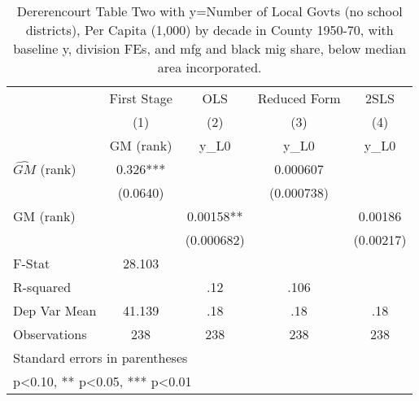 \begin{table}[htbp]\centering
\def\sym#1{\ifmmode^{#1}\else\(^{#1}\)\fi}
\caption{Dererencourt Table Two with y=Number of Local Govts (no school districts), Per Capita (1,000) by decade in County 1950-70, with baseline y, division FEs, and mfg and black mig share, below median area incorporated.}
\begin{tabular}{l*{4}{c}}
\toprule
                    & First Stage   &         OLS   &Reduced Form   &        2SLS   \\
                    &\multicolumn{1}{c}{(1)}&\multicolumn{1}{c}{(2)}&\multicolumn{1}{c}{(3)}&\multicolumn{1}{c}{(4)}\\
                    &\multicolumn{1}{c}{GM  (rank)}&\multicolumn{1}{c}{y\_L0}&\multicolumn{1}{c}{y\_L0}&\multicolumn{1}{c}{y\_L0}\\
\midrule
$\hat{GM}$ (rank)   &       0.326***&               &    0.000607   &               \\
                    &    (0.0640)   &               &  (0.000738)   &               \\
\addlinespace
GM  (rank)          &               &     0.00158** &               &     0.00186   \\
                    &               &  (0.000682)   &               &   (0.00217)   \\
\midrule
F-Stat              &      28.103   &               &               &               \\
R-squared           &               &         .12   &        .106   &               \\
Dep Var Mean        &      41.139   &         .18   &         .18   &         .18   \\
Observations        &         238   &         238   &         238   &         238   \\
\bottomrule
\multicolumn{5}{l}{\footnotesize Standard errors in parentheses}\\
\multicolumn{5}{l}{\footnotesize * p<0.10, ** p<0.05, *** p<0.01}\\
\end{tabular}
\end{table}
